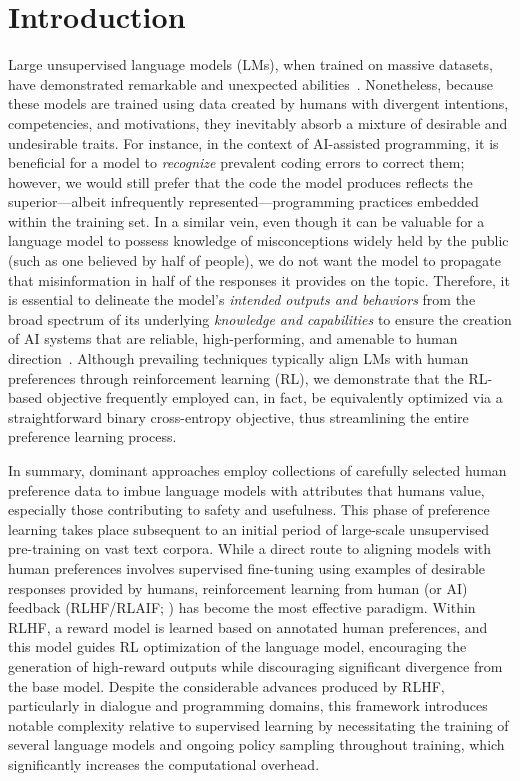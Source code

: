 \section{Introduction}
Large unsupervised language models (LMs), when trained on massive datasets, have demonstrated remarkable and unexpected abilities~\citep{chowdhery2022palm, brown2020language, touvron2023llama, bubeck2023sparks}. Nonetheless, because these models are trained using data created by humans with divergent intentions, competencies, and motivations, they inevitably absorb a mixture of desirable and undesirable traits. For instance, in the context of AI-assisted programming, it is beneficial for a model to \textit{recognize} prevalent coding errors to correct them; however, we would still prefer that the code the model produces reflects the superior—albeit infrequently represented—programming practices embedded within the training set. In a similar vein, even though it can be valuable for a language model to possess knowledge of misconceptions widely held by the public (such as one believed by half of people), we do not want the model to propagate that misinformation in half of the responses it provides on the topic. Therefore, it is essential to delineate the model's \emph{intended outputs and behaviors} from the broad spectrum of its underlying \textit{knowledge and capabilities} to ensure the creation of AI systems that are reliable, high-performing, and amenable to human direction~\citep{ouyang2022training}. Although prevailing techniques typically align LMs with human preferences through reinforcement learning (RL), we demonstrate that the RL-based objective frequently employed can, in fact, be equivalently optimized via a straightforward binary cross-entropy objective, thus streamlining the entire preference learning process.

In summary, dominant approaches employ collections of carefully selected human preference data to imbue language models with attributes that humans value, especially those contributing to safety and usefulness. This phase of preference learning takes place subsequent to an initial period of large-scale unsupervised pre-training on vast text corpora. While a direct route to aligning models with human preferences involves supervised fine-tuning using examples of desirable responses provided by humans, reinforcement learning from human (or AI) feedback (RLHF/RLAIF; \citep{christiano2017deep, bai2022constitutional}) has become the most effective paradigm. Within RLHF, a reward model is learned based on annotated human preferences, and this model guides RL optimization of the language model, encouraging the generation of high-reward outputs while discouraging significant divergence from the base model. Despite the considerable advances produced by RLHF, particularly in dialogue and programming domains, this framework introduces notable complexity relative to supervised learning by necessitating the training of several language models and ongoing policy sampling throughout training, which significantly increases the computational overhead.

